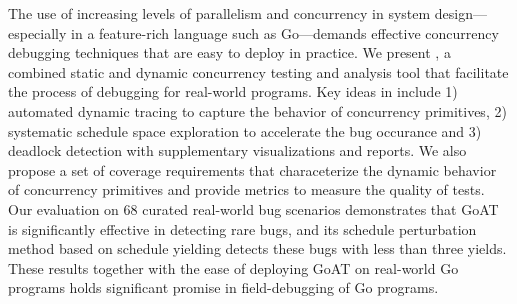 The use of increasing levels of parallelism and concurrency in system
design---especially in a feature-rich language such as Go---demands
effective concurrency debugging techniques that are easy to deploy in practice.
%
We present \goat, a combined static and dynamic concurrency testing
and analysis tool that facilitate the process of debugging for real-world programs.
%
Key ideas in \goat include
1) automated dynamic tracing to capture the behavior of concurrency primitives,
2) systematic schedule space exploration to accelerate the bug occurance
and 3) deadlock detection with supplementary visualizations and reports.
We also propose a set of coverage requirements that characeterize the dynamic behavior of concurrency primitives and provide metrics to measure the quality of tests.
%
Our evaluation on 68 curated real-world bug scenarios
demonstrates that GoAT is significantly effective in detecting
rare bugs, and its schedule perturbation method based on schedule
yielding detects these bugs with less than three yields.
%
These results together with the ease of deploying GoAT on real-world
Go programs holds significant promise in field-debugging of Go programs.
